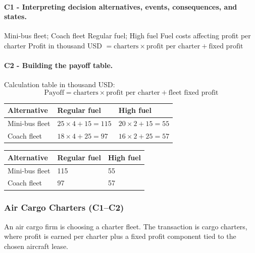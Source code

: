 	\paragraph*{C1 - Interpreting decision alternatives, events, consequences, and states.}
	\label{subsec:problem20-regional-bus-charters-c1}
	\DecisionElementsTable
	{Mini-bus fleet; Coach fleet}
	{Regular fuel; High fuel}
	{Fuel costs affecting profit per charter}
	{Profit in thousand USD $= \text{charters} \times \text{profit per charter} + \text{fixed profit}$}


	\paragraph*{C2 - Building the payoff table.}
	\label{subsec:problem20-regional-bus-charters-c2}
	Calculation table in thousand USD:
	\[
	\text{Payoff}=\text{charters}\times\text{profit per charter}+\text{fleet fixed profit}
	\]
	\begin{center}
		\begin{tabular}{lll}
			\toprule
			Alternative & Regular fuel & High fuel \\
			\midrule
			Mini-bus fleet & $25 \times 4 + 15 = 115$ & $20 \times 2 + 15 = 55$ \\
			Coach fleet & $18 \times 4 + 25 = 97$ & $16 \times 2 + 25 = 57$ \\
			\bottomrule
		\end{tabular}
	\end{center}

	\begin{center}
		\begin{tabular}{lll}
			\toprule
			Alternative & Regular fuel & High fuel \\
			\midrule
			Mini-bus fleet & 115 & 55 \\
			Coach fleet & 97 & 57 \\
			\bottomrule
		\end{tabular}
	\end{center}


	\subsubsection{Air Cargo Charters (C1--C2)}
	\label{sec:problem21-air-cargo-charters-c1-c2}
	An air cargo firm is choosing a charter fleet. The transaction is cargo charters, where profit is earned per charter plus a fixed profit component tied to the chosen aircraft lease.


